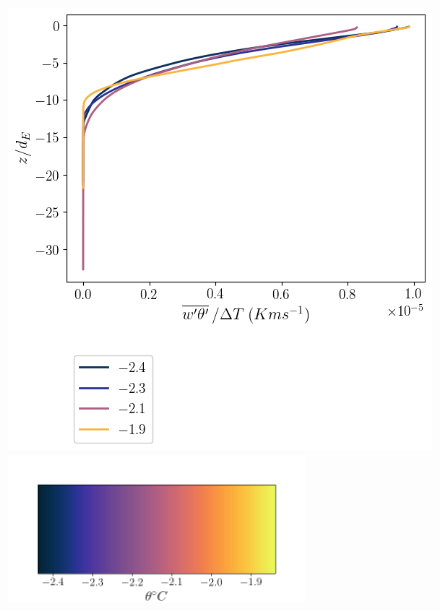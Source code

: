 \documentclass[draft]{agujournal2019}
\begin{document}
\begin{figure}[h!]
\begin{minipage}{0.5\textwidth}
    \end{minipage}
    \begin{minipage}{0.5\textwidth}
        \includegraphics[trim={0 4cm 0 0},clip,width=\textwidth]{Figures/heatflux_cmp_dT_43h_tav13_dTscale_z_profile.png}
        \centering \includegraphics[width=0.7\textwidth,trim={1cm 0cm 1cm 5cm}, clip]{Figures/colorbar_thermal_driving.png}
    \end{minipage}%
    \begin{minipage}{0.5\textwidth}

\end{minipage}
\end{figure}
\end{document}

